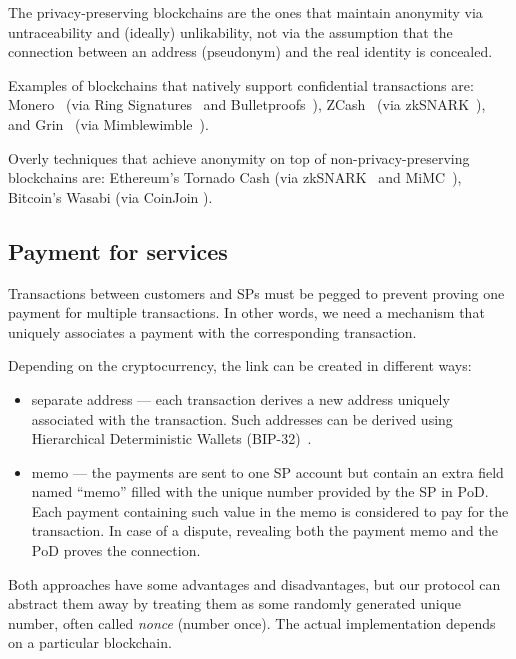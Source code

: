 \documentclass{ieeeaccess}
\begin{document}
The privacy-preserving blockchains are the ones that maintain anonymity via untraceability and (ideally) unlikability, not via the assumption that the connection between an address (pseudonym) and the real identity is concealed.   

Examples of blockchains that natively support confidential transactions are: Monero~\cite{van2013cryptonote} (via Ring Signatures~\cite{cryptoeprint:2015:1098} and Bulletproofs~\cite{Bulletpr14, bunz2018bulletproofs}), ZCash~\cite{sasson2014zerocash} (via zkSNARK~\cite{ben2013snarks}), and Grin~\cite{fuchsbauer2019aggregate} (via Mimblewimble~\cite{httpsdow19}).

Overly techniques that achieve anonymity on top of non-privacy-preserving blockchains are: Ethereum's Tornado Cash\cite{pertsev2019tornado} (via zkSNARK~\cite{groth2016size} and MiMC~\cite{albrecht2016mimc}), Bitcoin's Wasabi\cite{WasabiWa56} (via CoinJoin \cite{CoinJoin41}).

\subsection{Payment for services}\label{payment-for-services}
Transactions between customers and SPs must be pegged to prevent proving one payment for multiple transactions. In other
words, we need a mechanism that uniquely associates a payment with the corresponding transaction.

Depending on the cryptocurrency, the link can be created in different
ways:

\begin{itemize}

\item
  separate address — each transaction derives a new address uniquely
  associated with the transaction. Such addresses can be derived
  using Hierarchical Deterministic Wallets (BIP-32)~\cite{bipsbip089}.
\item
  memo — the payments are sent to one SP account but contain an extra
  field named ``memo'' filled with the unique number provided by the SP in $\mathrm{PoD}$. Each payment containing such value in the memo is
  considered to pay for the transaction. In case of a dispute, revealing both the payment memo and the $\mathrm{PoD}$ proves the connection.
\end{itemize}

Both approaches have some advantages and disadvantages, but our protocol can abstract them away by treating them as some randomly generated unique number, often called \textit{nonce} (number once). The actual implementation depends on a particular blockchain.
\end{document}
